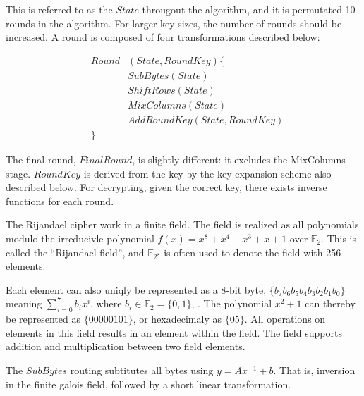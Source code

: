 This is referred to as the $State$ througout the algorithm, and it
is permutated 10 rounds in the algorithm. For larger key sizes, the
number of rounds should be increased. A round is composed of four
transformations described below:

\begin{eqnarray*}
&Round&(State, RoundKey) \{\\
  & &SubBytes (State)\\
  & &ShiftRows (State)\\
  & &MixColumns (State)\\
  & &AddRoundKey (State, RoundKey)\\
&\}&
\end{eqnarray*}

The final round, $FinalRound$, is slightly different: it excludes the
MixColumns stage. $RoundKey$ is derived from the key by the key
expansion scheme also described below. For decrypting, given the
correct key, there exists inverse functions for each round.

The Rijandael cipher work in a finite field. The field is realized as
all polynomials modulo the irreducivle polynomial $f(x) = x^8 + x^4 +
x^3 + x + 1$ over $\mathbb{F}_2$. This is called the ``Rijandael
field'', and $\mathbb{F}_{2^8}$ is often used to denote the field with
256 elements.

Each element can also uniqly be represented as a 8-bit byte, $\{b_7
b_6 b_5 b_4 b_3 b_2 b_1 b_0\}$ meaning $\sum_{i=0}^7 b_i x^i$, where
$b_i \in \mathbb{F}_2 = \{0,1\}$, . The polynomial $x^2 + 1$ can
thereby be represented as $\{00000101\}$, or hexadecimaly as $\{05\}$.
All operations on elements in this field results in an element within
the field. The field supports addition and multiplication between two
field elements.

The $SubBytes$ routing subtitutes all bytes using $y = A x^{-1} + b$.
That is, inversion in the finite galois field, followed by a short
linear transformation.


